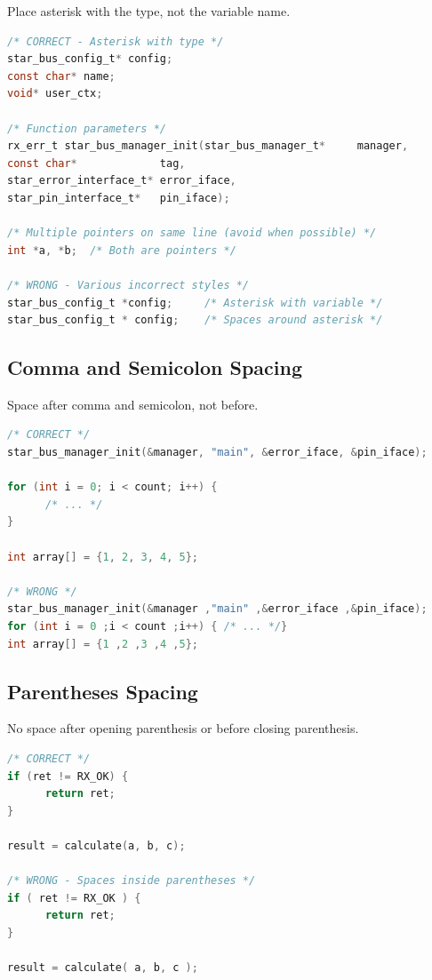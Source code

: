Place asterisk with the type, not the variable name.

\begin{lstlisting}[language=C]
/* CORRECT - Asterisk with type */
star_bus_config_t* config;
const char* name;
void* user_ctx;

/* Function parameters */
rx_err_t star_bus_manager_init(star_bus_manager_t*     manager,
const char*             tag,
star_error_interface_t* error_iface,
star_pin_interface_t*   pin_iface);

/* Multiple pointers on same line (avoid when possible) */
int *a, *b;  /* Both are pointers */

/* WRONG - Various incorrect styles */
star_bus_config_t *config;     /* Asterisk with variable */
star_bus_config_t * config;    /* Spaces around asterisk */
\end{lstlisting}

\subsection{Comma and Semicolon Spacing}

Space after comma and semicolon, not before.

\begin{lstlisting}[language=C]
/* CORRECT */
star_bus_manager_init(&manager, "main", &error_iface, &pin_iface);

for (int i = 0; i < count; i++) {
      /* ... */
}

int array[] = {1, 2, 3, 4, 5};

/* WRONG */
star_bus_manager_init(&manager ,"main" ,&error_iface ,&pin_iface);
for (int i = 0 ;i < count ;i++) { /* ... */}
int array[] = {1 ,2 ,3 ,4 ,5};
\end{lstlisting}

\subsection{Parentheses Spacing}

No space after opening parenthesis or before closing parenthesis.

\begin{lstlisting}[language=C]
/* CORRECT */
if (ret != RX_OK) {
      return ret;
}

result = calculate(a, b, c);

/* WRONG - Spaces inside parentheses */
if ( ret != RX_OK ) {
      return ret;
}

result = calculate( a, b, c );
\end{lstlisting}

